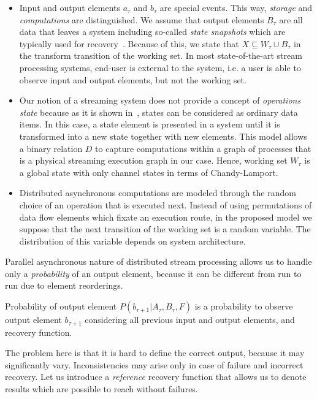\begin{itemize}
    \item Input and output elements $a_\tau$ and $b_\tau$ are special events. This way, {\em storage} and {\em computations} are distinguished. We assume that output elements $B_\tau$ are all data that leaves a system including so-called {\em state snapshots} which are typically used for recovery~\cite{Carbone:2017:SMA:3137765.3137777}. Because of this, we state that $X \subseteq W_\tau \cup B_\tau$ in the transform transition of the working set. In most state-of-the-art stream processing systems, end-user is external to the system, i.e. a user is able to observe input and output elements, but not the working set.
    \item Our notion of a streaming system does not provide a concept of {\em operations state} because as it is shown in~\cite{we2018adbis}, states can be considered as ordinary data items. In this case, a state element is presented in a system until it is transformed into a new state together with new elements. This model allows a binary relation $D$ to capture computations within a graph of processes that is a physical streaming execution graph in our case. Hence, working set $W_\tau$ is a global state with only channel states in terms of Chandy-Lamport.
    \item Distributed asynchronous computations are modeled through the random choice of an operation that is executed next. Instead of using permutations of data flow elements which fixate an execution route, in the proposed model we suppose that the next transition of the working set is a random variable. The distribution of this variable depends on system architecture. 
\end{itemize}

Parallel asynchronous nature of distributed stream processing allows us to handle only a {\em probability} of an output element, because it can be different from run to run due to element reorderings.

\begin{definition}{Probability of output element}
$P(b_{\tau+1}|A_{\tau}, B_\tau, F)$ is a probability to observe output element $b_{\tau+1}$ considering all previous input and output elements, and recovery function.
\end{definition}

The problem here is that it is hard to define the correct output, because it may significantly vary. Inconsistencies may arise only in case of failure and incorrect recovery. Let us introduce a {\em reference} recovery function that allows us to denote results which are possible to reach without failures.

